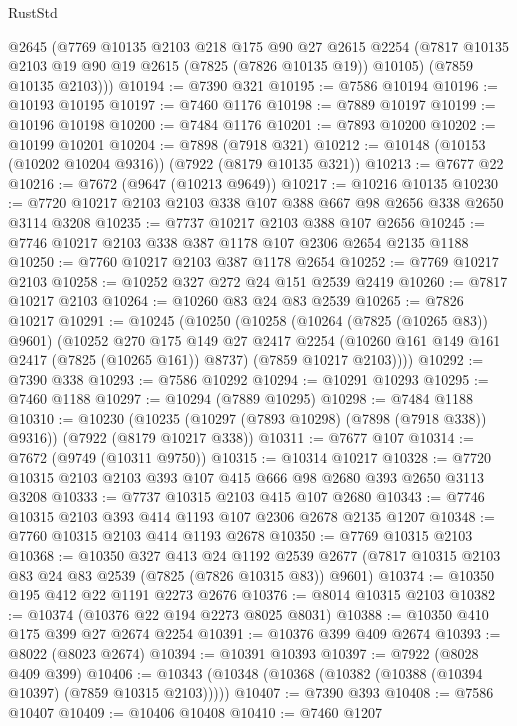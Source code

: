 \begin{lexlean}{RustStd}
\begin{coremodule}
      @2645
      (@7769
        @10135
        @2103
        @218
        @175
        @90
        @27
        @2615
        @2254
        (@7817 @10135 @2103 @19 @90 @19 @2615 (@7825 (@7826 @10135 @19)) @10105)
        (@7859 @10135 @2103)))
@10194 := @7390 @321
@10195 := @7586 @10194
@10196 := @10193 @10195
@10197 := @7460 @1176
@10198 := @7889 @10197
@10199 := @10196 @10198
@10200 := @7484 @1176
@10201 := @7893 @10200
@10202 := @10199 @10201
@10204 := @7898 (@7918 @321)
@10212 := @10148 (@10153 (@10202 @10204 @9316)) (@7922 (@8179 @10135 @321))
@10213 := @7677 @22
@10216 := @7672 (@9647 (@10213 @9649))
@10217 := @10216 @10135
@10230 := @7720 @10217 @2103 @2103 @338 @107 @388 @667 @98 @2656 @338 @2650 @3114 @3208
@10235 := @7737 @10217 @2103 @388 @107 @2656
@10245 := @7746 @10217 @2103 @338 @387 @1178 @107 @2306 @2654 @2135 @1188
@10250 := @7760 @10217 @2103 @387 @1178 @2654
@10252 := @7769 @10217 @2103
@10258 := @10252 @327 @272 @24 @151 @2539 @2419
@10260 := @7817 @10217 @2103
@10264 := @10260 @83 @24 @83 @2539
@10265 := @7826 @10217
@10291 := @10245
    (@10250
      (@10258
        (@10264 (@7825 (@10265 @83)) @9601)
        (@10252
          @270
          @175
          @149
          @27
          @2417
          @2254
          (@10260 @161 @149 @161 @2417 (@7825 (@10265 @161)) @8737)
          (@7859 @10217 @2103))))
@10292 := @7390 @338
@10293 := @7586 @10292
@10294 := @10291 @10293
@10295 := @7460 @1188
@10297 := @10294 (@7889 @10295)
@10298 := @7484 @1188
@10310 := @10230
    (@10235 (@10297 (@7893 @10298) (@7898 (@7918 @338)) @9316))
    (@7922 (@8179 @10217 @338))
@10311 := @7677 @107
@10314 := @7672 (@9749 (@10311 @9750))
@10315 := @10314 @10217
@10328 := @7720 @10315 @2103 @2103 @393 @107 @415 @666 @98 @2680 @393 @2650 @3113 @3208
@10333 := @7737 @10315 @2103 @415 @107 @2680
@10343 := @7746 @10315 @2103 @393 @414 @1193 @107 @2306 @2678 @2135 @1207
@10348 := @7760 @10315 @2103 @414 @1193 @2678
@10350 := @7769 @10315 @2103
@10368 := @10350
    @327
    @413
    @24
    @1192
    @2539
    @2677
    (@7817 @10315 @2103 @83 @24 @83 @2539 (@7825 (@7826 @10315 @83)) @9601)
@10374 := @10350 @195 @412 @22 @1191 @2273 @2676
@10376 := @8014 @10315 @2103
@10382 := @10374 (@10376 @22 @194 @2273 @8025 @8031)
@10388 := @10350 @410 @175 @399 @27 @2674 @2254
@10391 := @10376 @399 @409 @2674
@10393 := @8022 (@8023 @2674)
@10394 := @10391 @10393
@10397 := @7922 (@8028 @409 @399)
@10406 := @10343 (@10348 (@10368 (@10382 (@10388 (@10394 @10397) (@7859 @10315 @2103)))))
@10407 := @7390 @393
@10408 := @7586 @10407
@10409 := @10406 @10408
@10410 := @7460 @1207

\end{coremodule}
\end{lexlean}
